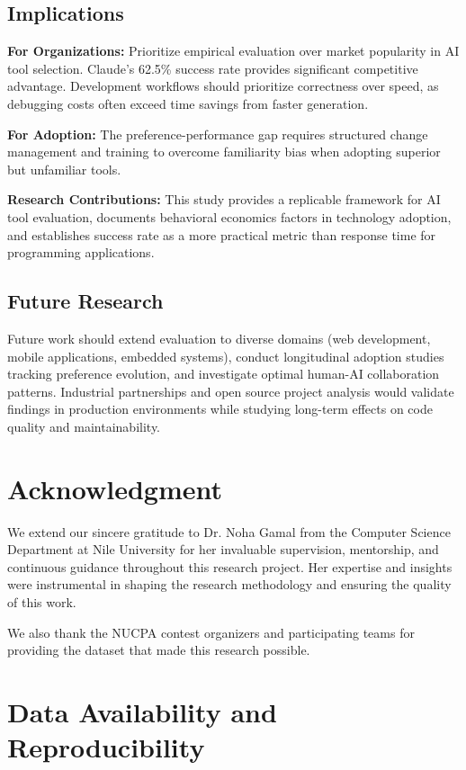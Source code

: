 \documentclass[conference]{IEEEtran}
\begin{document}
\subsection{Implications}

\textbf{For Organizations:} Prioritize empirical evaluation over market popularity in AI tool selection. Claude's 62.5\% success rate provides significant competitive advantage. Development workflows should prioritize correctness over speed, as debugging costs often exceed time savings from faster generation.

\textbf{For Adoption:} The preference-performance gap requires structured change management and training to overcome familiarity bias when adopting superior but unfamiliar tools.

\textbf{Research Contributions:} This study provides a replicable framework for AI tool evaluation, documents behavioral economics factors in technology adoption, and establishes success rate as a more practical metric than response time for programming applications.

\subsection{Future Research}

Future work should extend evaluation to diverse domains (web development, mobile applications, embedded systems), conduct longitudinal adoption studies tracking preference evolution, and investigate optimal human-AI collaboration patterns. Industrial partnerships and open source project analysis would validate findings in production environments while studying long-term effects on code quality and maintainability.

\section*{Acknowledgment}

We extend our sincere gratitude to Dr. Noha Gamal from the Computer Science Department at Nile University for her invaluable supervision, mentorship, and continuous guidance throughout this research project. Her expertise and insights were instrumental in shaping the research methodology and ensuring the quality of this work.

We also thank the NUCPA contest organizers and participating teams for providing the dataset that made this research possible.

\section*{Data Availability and Reproducibility}
\end{document}
